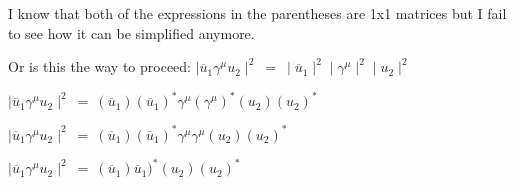 \documentclass[12pt]{article}
\def \ou{\overline{u}}
\def \ga{\gamma}
\begin{document}
\begin{enumerate}
I know that both of the expressions in the parentheses are 1x1 matrices but I fail to see how it can be simplified anymore.

Or is this the way to proceed:
$\mid \ou_1 \ga^\mu u_2 \mid^2 ~=~ \mid\ou_1\mid^2 \mid\ga^\mu\mid^2 \mid u_2 \mid^2$

$\mid \ou_1 \ga^\mu u_2 \mid^2 ~=~ (\ou_1)(\overline{u}_1)^*\ga^\mu (\ga^\mu)^* (u_2)(u_2)^*$

$\mid \ou_1 \ga^\mu u_2 \mid^2 ~=~ (\ou_1)(\ou_1)^*\ga^\mu \ga^\mu (u_2)(u_2)^*$

$\mid \ou_1 \ga^\mu u_2 \mid^2 ~=~ (\ou_1)\ou_1)^* (u_2)(u_2)^*$

\end{enumerate}
\end{document}
